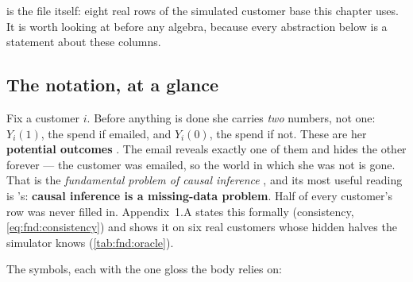  is the file itself: eight real rows of the simulated customer base this
chapter uses. It is worth looking at before any algebra, because every abstraction below is a
statement about these columns.



\subsection*{The notation, at a glance}

Fix a customer $i$. Before anything is done she carries \emph{two} numbers, not one: $Y_i(1)$,
the spend if emailed, and $Y_i(0)$, the spend if not. These are her \textbf{potential outcomes}
\citep{neyman1923, rubin1974}. The email reveals exactly one of them and hides the other forever
--- the customer was emailed, so the world in which she was not is gone. That is the
\emph{fundamental problem of causal inference} \citep{holland1986}, and its most useful reading
is \citet{ding2018}'s: \textbf{causal inference is a missing-data problem}. Half of every
customer's row was never filled in. Appendix~1.A states this formally (consistency,
\cref{eq:fnd:consistency}) and shows it on six real customers whose hidden halves the simulator
knows (\cref{tab:fnd:oracle}).

The symbols, each with the one gloss the body relies on:


